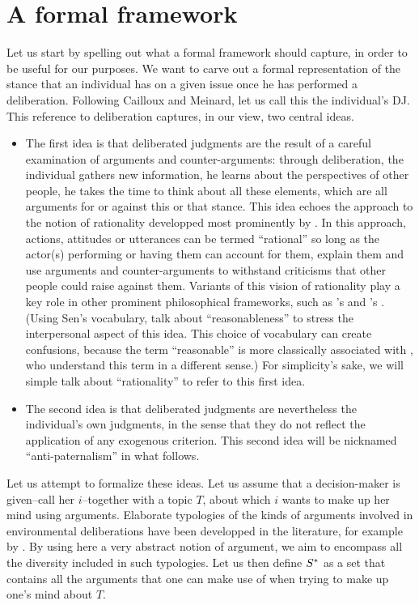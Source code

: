 \documentclass[version=last, pagesize, twoside=off, bibliography=totoc, DIV=calc, fontsize=14pt, a4paper, french, english]{scrartcl}
\begin{document}
\section{A formal framework}
Let us start by spelling out what a formal framework should capture, in order to be useful for our purposes. We want to carve out a formal representation of the stance that an individual has on a given issue once he has performed a deliberation. Following Cailloux and Meinard, let us call this the individual's \ac{DJ}. This reference to deliberation captures, in our view, two central ideas.
\begin{itemize}
\item The first idea is that deliberated judgments are the result of a careful examination of arguments and counter-arguments: through deliberation, the individual gathers new information, he learns about the perspectives of other people, he takes the time to think about all these elements, which are all arguments for or against this or that stance. This idea echoes the approach to the notion of rationality developped most prominently by \citet{habermas_theorie_1981}. In this approach, actions, attitudes or utterances can be termed “rational” so long as the actor(s) performing or having them can account for them, explain them and use arguments and counter-arguments to withstand criticisms that other people could raise against them. Variants of this vision of rationality play a key role in other prominent philosophical frameworks, such as \citeauthor{scanlon_what_2000}’s \citeyearpar{scanlon_what_2000} and \citeauthor{sen_idea_2009}’s \citeyearpar{sen_idea_2009}. (Using Sen's vocabulary, \citet{bartkowski_beyond_2018} talk about ``reasonableness'' to stress the interpersonal aspect of this idea. This choice of vocabulary can create confusions, because the term ``reasonable'' is more classically associated with \citet{rawls_political_2005}, who understand this term in a different sense.) For simplicity's sake, we will simple talk about ``rationality'' to refer to this first idea.
\item The second idea is that deliberated judgments are nevertheless the individual's own judgments, in the sense that they do not reflect the application of any exogenous criterion. This second idea will be nicknamed ``anti-paternalism'' in what follows.
\end{itemize}

Let us attempt to formalize these ideas. Let us assume that a decision-maker is given--call her $i$--together with a topic $T$, about which $i$ wants to make up her mind using arguments. Elaborate typologies of the kinds of arguments involved in environmental deliberations have been developped in the literature, for example by \citet{chateauraynaud_contrainte_2007}. By using here a very abstract notion of argument, we aim to encompass all the diversity included in such typologies. Let us then define $S^*$ as a set that contains all the arguments that one can make use of when trying to make up one’s mind about $T$.
\end{document}
